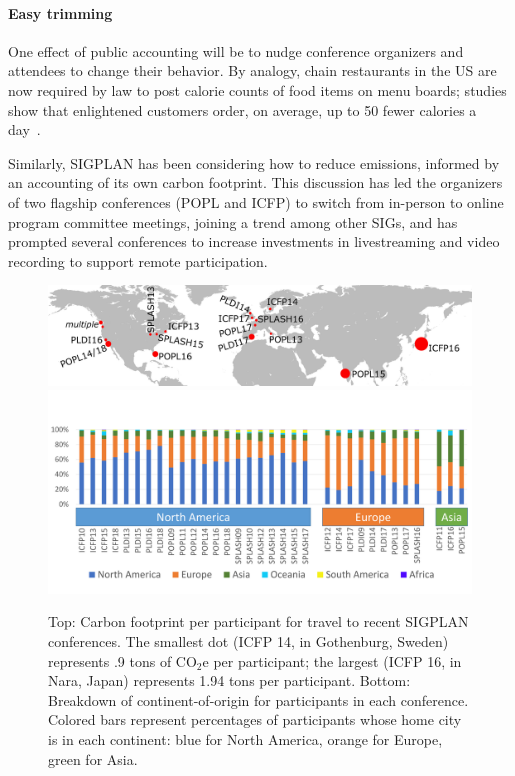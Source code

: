 \documentclass[12pt]{article}
\newcommand{\bcp}[1]{\ifdraft{\bf\textcolor{darkred}{[\bf bcp: #1]}}\fi}
\newcommand{\COtwoE}{CO$_2$e}
\newcommand{\PARAGRAPH}{\paragraph*}
\begin{document}
\PARAGRAPH{Easy trimming}
One effect of public accounting will be to nudge conference organizers and
attendees to change their behavior. By analogy, chain restaurants in the US
are now required by law to post calorie counts of food items on menu boards;
studies show that enlightened customers order, on average, up to 50 fewer
calories a day~\cite{menu}.

Similarly, SIGPLAN has been considering how to reduce emissions, informed by
an accounting of its own carbon footprint. This discussion has led the
organizers of two flagship
conferences (POPL and ICFP) to switch from in-person to online program
committee meetings, joining a trend among other SIGs, and has prompted
several conferences to increase investments in livestreaming and video
recording to support remote participation.

\begin{figure}[t!]
\centering
\includegraphics[width=6in]{SIGPLAN-confs2.png}
\includegraphics[width=6in]{ParticipantsOriginAll3.png}
\caption{Top: Carbon footprint per participant for travel to recent SIGPLAN
  conferences.  The smallest dot (ICFP
  14, in Gothenburg, Sweden) represents .9 tons of {\COtwoE} per participant; the
  largest (ICFP 16, in Nara, Japan) represents 1.94 tons per
  participant. Bottom: Breakdown of continent-of-origin for participants in
  each conference.  Colored bars represent percentages of participants whose
  home city is in each continent: blue for North America, orange for Europe,
  green for Asia.
%
}
\label{fig:confs}
\end{figure}
\end{document}
